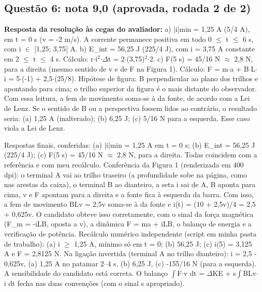 \documentclass{article}%
\begin{document}
\subsection*{Questão 6: nota 9,0 (aprovada, rodada 2 de 2)}%
\textbf{Resposta da resolução às cegas do avaliador:} a) |i|min = 1,25 A (5/4 A), em t = 0 s (v = -2 m/s). A corrente permanece positiva em todo 0 $\leq$ t $\leq$ 6 s, com i $\in$ {[}1,25; 3,75{]} A.\newline%
b) E\_int = 56,25 J (225/4 J), com i = 3,75 A constante em 2 $\leq$ t $\leq$ 4 s. Cálculo: r$\cdot$i$^2$$\cdot$$\Delta$t = 2$\cdot$(3,75)$^2$$\cdot$2.\newline%
c) F(5 s) = 45/16 N $\approx$ 2,8 N, para a direita (mesmo sentido de v e de F na Figura 1). Cálculo: F = m$\cdot$a + B$\cdot$L$\cdot$i = 5$\cdot$(-1) + 2,5$\cdot$(25/8).\newline%
\newline%
Hipótese de figura: B perpendicular ao plano dos trilhos e apontando para cima; o trilho superior da figura é o mais distante do observador. Com essa leitura, a fem de movimento soma{-}se à da fonte, de acordo com a Lei de Lenz. Se o sentido de B ou a perspectiva fossem lidos ao contrário, o resultado seria: (a) 1,25 A (inalterado); (b) 6,25 J; (c) 5/16 N para a esquerda. Esse caso viola a Lei de Lenz.\par %
Respostas finais, conferidas: (a) |i|min = 1,25 A em t = 0 s; (b) E\_int = 56,25 J (225/4 J); (c) F(5 s) = 45/16 N $\approx$ 2,8 N, para a direita. Todas coincidem com a referência e com meu recálculo.\newline%
\newline%
Conferência da Figura 1 (renderizada em 400 dpi): o terminal A vai ao trilho traseiro (a profundidade sobe na página, como nas arestas da caixa), o terminal B ao dianteiro, a seta i sai de A, B aponta para cima, v e F apontam para a direita e a fonte fica à esquerda da barra. Com isso, a fem de movimento BLv = 2,5v soma{-}se à da fonte e i(t) = (10 + 2,5v)/4 = 2,5 + 0,625v. O candidato obteve isso corretamente, com o sinal da força magnética (F\_m = -iLB, oposta a v), a dinâmica F = ma + iLB, o balanço de energia e a verificação de potência.\newline%
\newline%
Recálculo numérico independente (script em minha pasta de trabalho): (a) i $\geq$ 1,25 A, mínimo só em t = 0; (b) 56,25 J; (c) i(5) = 3,125 A e F = 2,8125 N. Na ligação invertida (terminal A no trilho dianteiro): i = 2,5 - 0,625v, (a) 1,25 A no patamar 2--4 s, (b) 6,25 J, (c) -155/16 N (para a esquerda). A sensibilidade do candidato está correta. O balanço $\int$F$\cdot$v dt = $\Delta$KE + s$\int$BLv$\cdot$i dt fecha nas duas convenções (com o sinal s apropriado).\newline%
$$
\end{document}
